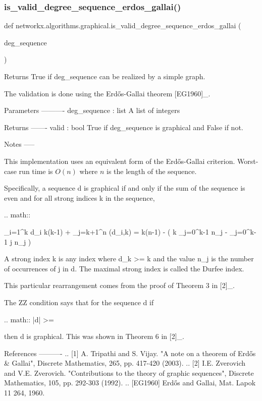 \subsubsection{\texorpdfstring{is\+\_\+valid\+\_\+degree\+\_\+sequence\+\_\+erdos\+\_\+gallai()}{is\_valid\_degree\_sequence\_erdos\_gallai()}}
{\footnotesize\ttfamily def networkx.\+algorithms.\+graphical.\+is\+\_\+valid\+\_\+degree\+\_\+sequence\+\_\+erdos\+\_\+gallai (\begin{DoxyParamCaption}\item[{}]{deg\+\_\+sequence }\end{DoxyParamCaption})}

\begin{DoxyVerb}Returns True if deg_sequence can be realized by a simple graph.

The validation is done using the Erdős-Gallai theorem [EG1960]_.

Parameters
----------
deg_sequence : list
    A list of integers

Returns
-------
valid : bool
    True if deg_sequence is graphical and False if not.

Notes
-----

This implementation uses an equivalent form of the Erdős-Gallai criterion.
Worst-case run time is $O(n)$ where $n$ is the length of the sequence.

Specifically, a sequence d is graphical if and only if the
sum of the sequence is even and for all strong indices k in the sequence,

 .. math::

   \sum_{i=1}^{k} d_i \leq k(k-1) + \sum_{j=k+1}^{n} \min(d_i,k)
         = k(n-1) - ( k \sum_{j=0}^{k-1} n_j - \sum_{j=0}^{k-1} j n_j )

A strong index k is any index where d_k >= k and the value n_j is the
number of occurrences of j in d.  The maximal strong index is called the
Durfee index.

This particular rearrangement comes from the proof of Theorem 3 in [2]_.

The ZZ condition says that for the sequence d if

.. math::
    |d| >= 

then d is graphical.  This was shown in Theorem 6 in [2]_.

References
----------
.. [1] A. Tripathi and S. Vijay. "A note on a theorem of Erdős & Gallai",
   Discrete Mathematics, 265, pp. 417-420 (2003).
.. [2] I.E. Zverovich and V.E. Zverovich. "Contributions to the theory
   of graphic sequences", Discrete Mathematics, 105, pp. 292-303 (1992).
.. [EG1960] Erdős and Gallai, Mat. Lapok 11 264, 1960.
\end{DoxyVerb}
